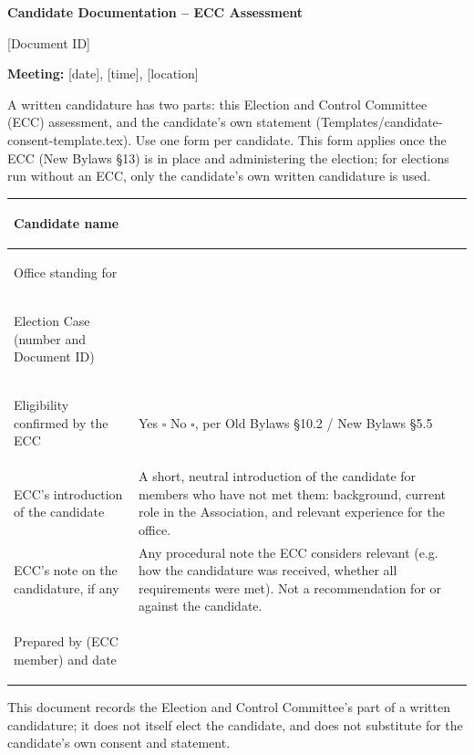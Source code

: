 \documentclass{../../Common/Latex/Templates/rapport}
\newcommand{\meetingline}{\textbf{Meeting:} [date], [time], [location]}
\begin{document}
\reportmainmatter
\small
\setlength{\parindent}{0pt}
\setlength{\tabcolsep}{6pt}
\renewcommand{\arraystretch}{1.2}

\begin{center}
  {\Large\bfseries Candidate Documentation -- ECC Assessment}\par
  \vspace{0.15cm}
  {\normalsize [Document ID]}\par
  \vspace{0.1cm}
  {\small \meetingline}\par
\end{center}

\vspace{0.2cm}
A written candidature has two parts: this Election and Control Committee (ECC) assessment, and the candidate's own statement (Templates/candidate-consent-template.tex). Use one form per candidate. This form applies once the ECC (New Bylaws \S13) is in place and administering the election; for elections run without an ECC, only the candidate's own written candidature is used.

\vspace{0.4cm}
\begin{tabularx}{\textwidth}{|>{\bfseries\raggedright\arraybackslash}p{4.6cm}|X|}
  \hline
  Candidate name                          & \rule{0pt}{1.2cm} \\
  \hline
  Office standing for                     & \rule{0pt}{1.2cm} \\
  \hline
  Election Case (number and Document ID)  & \rule{0pt}{1.2cm} \\
  \hline
  Eligibility confirmed by the ECC        & \rule{0pt}{1.2cm}Yes \quad $\square$ \quad\quad No \quad $\square$, per Old Bylaws \S10.2 / New Bylaws \S5.5 \\
  \hline
  ECC's introduction of the candidate      & \rule{0pt}{3.2cm}A short, neutral introduction of the candidate for members who have not met them: background, current role in the Association, and relevant experience for the office. \\
  \hline
  ECC's note on the candidature, if any    & \rule{0pt}{2.4cm}Any procedural note the ECC considers relevant (e.g. how the candidature was received, whether all requirements were met). Not a recommendation for or against the candidate. \\
  \hline
  Prepared by (ECC member) and date        & \rule{0pt}{1.4cm} \\
  \hline
\end{tabularx}

\vfill
This document records the Election and Control Committee's part of a written candidature; it does not itself elect the candidate, and does not substitute for the candidate's own consent and statement.
\end{document}
